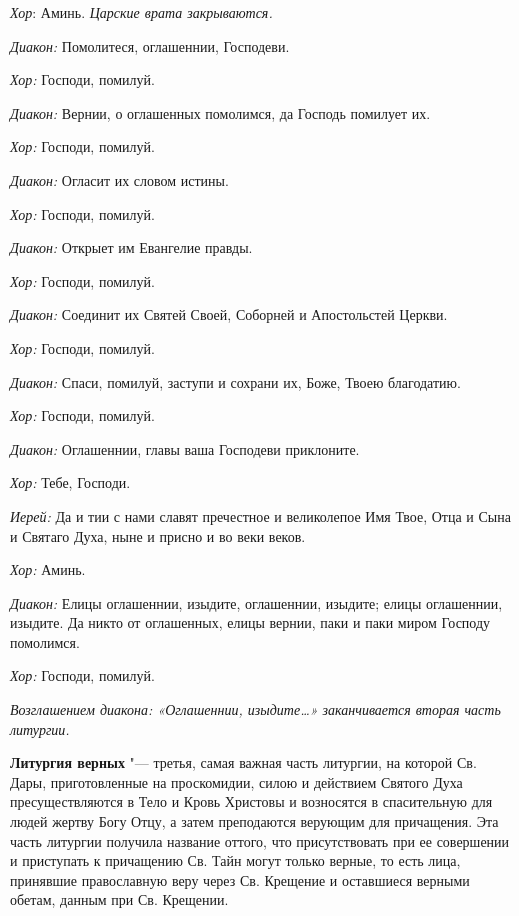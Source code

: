 \begin{mymulticols}
{\itshape Хор}: Аминь. {\itshape Царские врата закрываются.}


{\itshape Диакон:} Помолитеся, оглашеннии, Господеви.

{\itshape Хор:} Господи, помилуй.

{\itshape Диакон:} Вернии, о оглашенных помолимся, да Господь помилует их.

{\itshape Хор:} Господи, помилуй.

{\itshape Диакон:} Огласит их словом истины.

{\itshape Хор:} Господи, помилуй.

{\itshape Диакон:} Открыет им Евангелие правды.

{\itshape Хор:} Господи, помилуй.

{\itshape Диакон:} Соединит их Святей Своей, Соборней и Апостольстей Церкви.

{\itshape Хор:} Господи, помилуй.

{\itshape Диакон:} Спаси, помилуй, заступи и сохрани их, Боже, Твоею благодатию.

{\itshape Хор:} Господи, помилуй.

{\itshape Диакон:} Оглашеннии, главы ваша Господеви приклоните.

{\itshape Хор:} Тебе, Господи.

{\itshape Иерей:} Да и тии с нами славят пречестное и великолепое Имя Твое, Отца и Сына и Святаго Духа, ныне и присно и во веки веков.

{\itshape Хор:} Аминь.

{\itshape Диакон:} Елицы оглашеннии, изыдите, оглашеннии, изыдите; елицы оглашеннии, изыдите. Да никто от оглашенных, елицы вернии, паки и паки миром Господу помолимся.

{\itshape Хор:} Господи, помилуй.

{\itshape Возглашением диакона: «Оглашеннии, изыдите…» заканчивается вторая часть литургии.}

\end{mymulticols}

\mychapterending


{\bfseries Литургия верных} "--- третья, самая важная часть литургии, на которой Св. Дары, приготовленные на проскомидии, силою и действием Святого Духа пресуществляются в Тело и Кровь Христовы и возносятся в спасительную для людей жертву Богу Отцу, а затем преподаются верующим для причащения. Эта часть литургии получила название оттого, что присутствовать при ее совершении и приступать к причащению Св. Тайн могут только верные, то есть лица, принявшие православную веру через Св. Крещение и оставшиеся верными обетам, данным при Св. Крещении.

